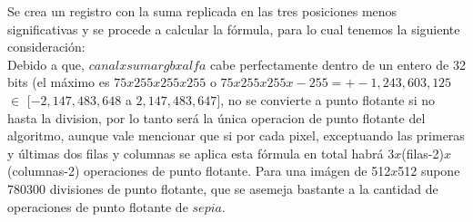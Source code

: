 Se crea un registro con la suma replicada en las tres posiciones menos significativas y se procede a calcular la fórmula, para lo cual tenemos la siguiente consideración:\\
 
Debido a que, $canal x sumargb x alfa$ cabe perfectamente dentro de un entero de 32 bits (el máximo es $75x255x255x255$ o $75x255x255x-255 = +-1,243,603,125$ $\in$ $[-2,147,483,648$ a $2,147,483,647]$, no se convierte a punto flotante si no hasta la division, por lo tanto será la única operacion de punto flotante del algoritmo, aunque vale mencionar que si por cada pixel, exceptuando las primeras y últimas dos filas y columnas se aplica esta fórmula en total habrá 3$x$(filas-2)$x$(columnas-2) operaciones de punto flotante. Para una imágen de 512$x$512 supone 780300 divisiones de punto flotante, que se asemeja bastante a la cantidad de operaciones de punto flotante de $sepia$.


